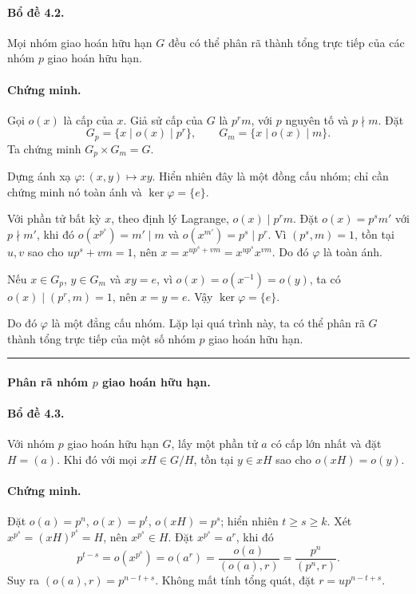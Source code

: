 \documentclass[11pt]{article}
\begin{document}
\paragraph{Bổ đề 4.2.}
Mọi nhóm giao hoán hữu hạn $G$ đều có thể phân rã thành tổng trực tiếp của các
nhóm $p$ giao hoán hữu hạn.

\paragraph{Chứng minh.}
Gọi $o(x)$ là cấp của $x$. Giả sử cấp của $G$ là $p^rm$, với $p$ nguyên tố và
$p\nmid m$. Đặt
\[
  G_p=\{x\mid o(x)\mid p^r\},\qquad
  G_m=\{x\mid o(x)\mid m\}.
\]
Ta chứng minh $G_p\times G_m=G$.

Dựng ánh xạ $\varphi:(x,y)\mapsto xy$. Hiển nhiên đây là một đồng cấu nhóm; chỉ
cần chứng minh nó toàn ánh và $\ker\varphi=\{e\}$.

Với phần tử bất kỳ $x$, theo định lý Lagrange, $o(x)\mid p^rm$. Đặt
$o(x)=p^sm'$ với $p\nmid m'$, khi đó $o(x^{p^s})=m'\mid m$ và
$o(x^{m'})=p^s\mid p^r$. Vì $(p^s,m)=1$, tồn tại $u,v$ sao cho
$up^s+vm=1$, nên $x=x^{up^s+vm}=x^{up^s}x^{vm}$. Do đó $\varphi$ là toàn ánh.

Nếu $x\in G_p$, $y\in G_m$ và $xy=e$, vì
$o(x)=o(x^{-1})=o(y)$, ta có $o(x)\mid(p^r,m)=1$, nên $x=y=e$. Vậy
$\ker\varphi=\{e\}$.

Do đó $\varphi$ là một đẳng cấu nhóm. Lặp lại quá trình này, ta có thể phân rã
$G$ thành tổng trực tiếp của một số nhóm $p$ giao hoán hữu hạn. \hfill\rule{0.55em}{0.55em}

\paragraph{Phân rã nhóm $p$ giao hoán hữu hạn.}

\paragraph{Bổ đề 4.3.}
Với nhóm $p$ giao hoán hữu hạn $G$, lấy một phần tử $a$ có cấp lớn nhất và đặt
$H=(a)$. Khi đó với mọi $xH\in G/H$, tồn tại $y\in xH$ sao cho
$o(xH)=o(y)$.

\paragraph{Chứng minh.}
Đặt $o(a)=p^n$, $o(x)=p^t$, $o(xH)=p^s$; hiển nhiên $t\ge s\ge k$. Xét
$x^{p^s}=(xH)^{p^s}=H$, nên $x^{p^s}\in H$. Đặt $x^{p^s}=a^r$, khi đó
\[
  p^{t-s}=o(x^{p^s})=o(a^r)=\frac{o(a)}{(o(a),r)}
  =\frac{p^n}{(p^n,r)}.
\]
Suy ra $(o(a),r)=p^{n-t+s}$. Không mất tính tổng quát, đặt
$r=up^{n-t+s}$.
\end{document}
